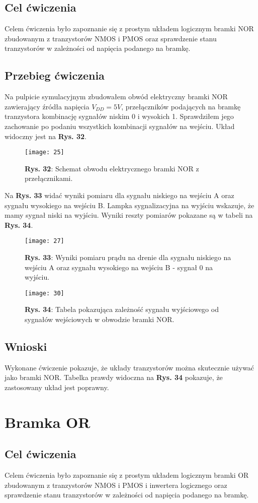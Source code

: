 \documentclass[11pt]{article}
\begin{document}
\subsection{Cel ćwiczenia}
Celem ćwiczenia było zapoznanie się z prostym układem logicznym bramki NOR zbudowanym z tranzystorów NMOS i PMOS oraz sprawdzenie stanu tranzystorów w zależności od napięcia podanego na bramkę.
\subsection{Przebieg ćwiczenia}
Na pulpicie symulacyjnym zbudowałem obwód elektryczny bramki NOR zawierający źródła napięcia $V_{DD}=5V$, przełączników podających na bramkę tranzystora kombinację sygnałów niskim 0 i wysokich 1. Sprawdziłem jego zachowanie
po podaniu wszystkich kombinacji sygnałów na wejściu. Układ widoczny jest na \textbf{Rys. 32}.
\begin{figure}[H]
\centering
\texttt{[image: 25]}
\caption*{\textbf{Rys. 32}: Schemat obwodu elektrycznego bramki NOR z przełącznikami. }
\end{figure}
\noindent Na \textbf{Rys. 33} widać wyniki pomiaru dla sygnału niskiego na wejściu A oraz sygnału wysokiego na wejściu B. Lampka sygnalizacyjna na wyjściu wskazuje, że mamy sygnał niski na wyjściu. Wyniki reszty pomiarów pokazane są w tabeli na \textbf{Rys. 34}.
\begin{figure}[H]
\centering
\texttt{[image: 27]}
\caption*{\textbf{Rys. 33}: Wyniki pomiaru prądu na drenie dla sygnału niskiego na wejściu A oraz sygnału wysokiego na wejściu B - sygnał 0 na wyjściu. }
\end{figure}
\begin{figure}[H]
\centering
\texttt{[image: 30]}
\caption*{\textbf{Rys. 34}: Tabela pokazująca zależność sygnału wyjściowego od sygnałów wejściowych w obwodzie bramki NOR.}
\end{figure}
\subsection{Wnioski}
Wykonane ćwiczenie pokazuje, że układy tranzystorów można skutecznie używać jako bramki NOR. Tabelka prawdy widoczna na \textbf{Rys. 34} pokazuje, że zastosowany układ jest poprawny.
\section{Bramka OR}
\subsection{Cel ćwiczenia}
Celem ćwiczenia było zapoznanie się z prostym układem logicznym bramki OR zbudowanym z tranzystorów NMOS i PMOS i inwertera logicznego oraz sprawdzenie stanu tranzystorów w zależności od napięcia podanego na bramkę.
\end{document}
